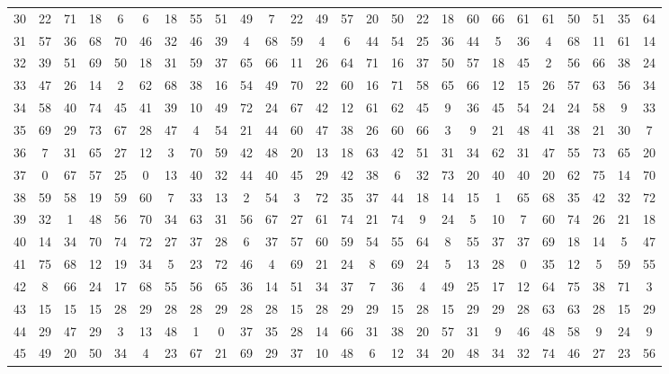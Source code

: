 \begin{table}
\begin{tabular}{c c c c c c c c c c c c c c c c c c c c c c c c c c }
30 & 22 & 71 & 18 & 6 & 6 & 18 & 55 & 51 & 49 & 7 & 22 & 49 & 57 & 20 & 50 & 22 & 18 & 60 & 66 & 61 & 61 & 50 & 51 & 35 & 64 \\
31 & 57 & 36 & 68 & 70 & 46 & 32 & 46 & 39 & 4 & 68 & 59 & 4 & 6 & 44 & 54 & 25 & 36 & 44 & 5 & 36 & 4 & 68 & 11 & 61 & 14 \\
32 & 39 & 51 & 69 & 50 & 18 & 31 & 59 & 37 & 65 & 66 & 11 & 26 & 64 & 71 & 16 & 37 & 50 & 57 & 18 & 45 & 2 & 56 & 66 & 38 & 24 \\
33 & 47 & 26 & 14 & 2 & 62 & 68 & 38 & 16 & 54 & 49 & 70 & 22 & 60 & 16 & 71 & 58 & 65 & 66 & 12 & 15 & 26 & 57 & 63 & 56 & 34 \\
34 & 58 & 40 & 74 & 45 & 41 & 39 & 10 & 49 & 72 & 24 & 67 & 42 & 12 & 61 & 62 & 45 & 9 & 36 & 45 & 54 & 24 & 24 & 58 & 9 & 33 \\
35 & 69 & 29 & 73 & 67 & 28 & 47 & 4 & 54 & 21 & 44 & 60 & 47 & 38 & 26 & 60 & 66 & 3 & 9 & 21 & 48 & 41 & 38 & 21 & 30 & 7 \\
36 & 7 & 31 & 65 & 27 & 12 & 3 & 70 & 59 & 42 & 48 & 20 & 13 & 18 & 63 & 42 & 51 & 31 & 34 & 62 & 31 & 47 & 55 & 73 & 65 & 20 \\
37 & 0 & 67 & 57 & 25 & 0 & 13 & 40 & 32 & 44 & 40 & 45 & 29 & 42 & 38 & 6 & 32 & 73 & 20 & 40 & 40 & 20 & 62 & 75 & 14 & 70 \\
38 & 59 & 58 & 19 & 59 & 60 & 7 & 33 & 13 & 2 & 54 & 3 & 72 & 35 & 37 & 44 & 18 & 14 & 15 & 1 & 65 & 68 & 35 & 42 & 32 & 72 \\
39 & 32 & 1 & 48 & 56 & 70 & 34 & 63 & 31 & 56 & 67 & 27 & 61 & 74 & 21 & 74 & 9 & 24 & 5 & 10 & 7 & 60 & 74 & 26 & 21 & 18 \\
40 & 14 & 34 & 70 & 74 & 72 & 27 & 37 & 28 & 6 & 37 & 57 & 60 & 59 & 54 & 55 & 64 & 8 & 55 & 37 & 37 & 69 & 18 & 14 & 5 & 47 \\
41 & 75 & 68 & 12 & 19 & 34 & 5 & 23 & 72 & 46 & 4 & 69 & 21 & 24 & 8 & 69 & 24 & 5 & 13 & 28 & 0 & 35 & 12 & 5 & 59 & 55 \\
42 & 8 & 66 & 24 & 17 & 68 & 55 & 56 & 65 & 36 & 14 & 51 & 34 & 37 & 7 & 36 & 4 & 49 & 25 & 17 & 12 & 64 & 75 & 38 & 71 & 3 \\
43 & 15 & 15 & 15 & 28 & 29 & 28 & 28 & 29 & 28 & 28 & 15 & 28 & 29 & 29 & 15 & 28 & 15 & 29 & 29 & 28 & 63 & 63 & 28 & 15 & 29 \\
44 & 29 & 47 & 29 & 3 & 13 & 48 & 1 & 0 & 37 & 35 & 28 & 14 & 66 & 31 & 38 & 20 & 57 & 31 & 9 & 46 & 48 & 58 & 9 & 24 & 9 \\
45 & 49 & 20 & 50 & 34 & 4 & 23 & 67 & 21 & 69 & 29 & 37 & 10 & 48 & 6 & 12 & 34 & 20 & 48 & 34 & 32 & 74 & 46 & 27 & 23 & 56 \\

\end{tabular}
\end{table}
